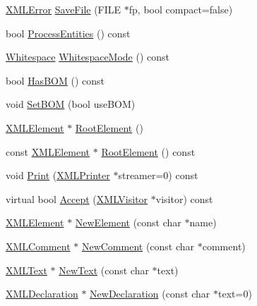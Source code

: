 \begin{DoxyCompactItemize}
\item 
\hyperlink{namespacetinyxml2_a1fbf88509c3ac88c09117b1947414e08}{X\+M\+L\+Error} \hyperlink{classtinyxml2_1_1_x_m_l_document_a8b95779479a0035acc67b3a61dfe1b74}{Save\+File} (F\+I\+LE $\ast$fp, bool compact=false)
\item 
bool \hyperlink{classtinyxml2_1_1_x_m_l_document_a53e6c035b1b539563fef8c817fb30469}{Process\+Entities} () const
\item 
\hyperlink{namespacetinyxml2_a7f91d00f77360f850fd5da0861e27dd5}{Whitespace} \hyperlink{classtinyxml2_1_1_x_m_l_document_a810ce508e6e0365497c2a9deb83c9ca7}{Whitespace\+Mode} () const
\item 
bool \hyperlink{classtinyxml2_1_1_x_m_l_document_a33fc5d159db873a179fa26338adb05bd}{Has\+B\+OM} () const
\item 
void \hyperlink{classtinyxml2_1_1_x_m_l_document_a14419b698f7c4b140df4e80f3f0c93b0}{Set\+B\+OM} (bool use\+B\+OM)
\item 
\hyperlink{classtinyxml2_1_1_x_m_l_element}{X\+M\+L\+Element} $\ast$ \hyperlink{classtinyxml2_1_1_x_m_l_document_ad2b70320d3c2a071c2f36928edff3e1c}{Root\+Element} ()
\item 
const \hyperlink{classtinyxml2_1_1_x_m_l_element}{X\+M\+L\+Element} $\ast$ \hyperlink{classtinyxml2_1_1_x_m_l_document_a2be8ef9d6346bdef34311f91529afae4}{Root\+Element} () const
\item 
void \hyperlink{classtinyxml2_1_1_x_m_l_document_a867cf5fa3e3ff6ae4847a8b7ee8ec083}{Print} (\hyperlink{classtinyxml2_1_1_x_m_l_printer}{X\+M\+L\+Printer} $\ast$streamer=0) const
\item 
virtual bool \hyperlink{classtinyxml2_1_1_x_m_l_document_ab7be651917a35ab1ff0e4e6d4e565cdf}{Accept} (\hyperlink{classtinyxml2_1_1_x_m_l_visitor}{X\+M\+L\+Visitor} $\ast$visitor) const
\item 
\hyperlink{classtinyxml2_1_1_x_m_l_element}{X\+M\+L\+Element} $\ast$ \hyperlink{classtinyxml2_1_1_x_m_l_document_a3c335a700a43d7c363a393142a23f234}{New\+Element} (const char $\ast$name)
\item 
\hyperlink{classtinyxml2_1_1_x_m_l_comment}{X\+M\+L\+Comment} $\ast$ \hyperlink{classtinyxml2_1_1_x_m_l_document_a386df0befd06aadb5e0cd21381aa955a}{New\+Comment} (const char $\ast$comment)
\item 
\hyperlink{classtinyxml2_1_1_x_m_l_text}{X\+M\+L\+Text} $\ast$ \hyperlink{classtinyxml2_1_1_x_m_l_document_acece5de77a0819f2341b08c1e1ed9987}{New\+Text} (const char $\ast$text)
\item 
\hyperlink{classtinyxml2_1_1_x_m_l_declaration}{X\+M\+L\+Declaration} $\ast$ \hyperlink{classtinyxml2_1_1_x_m_l_document_ae519030c0262fa2daff8993681990e16}{New\+Declaration} (const char $\ast$text=0)

\end{DoxyCompactItemize}

